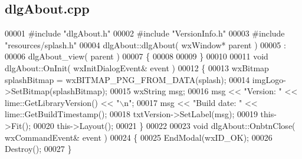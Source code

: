 \subsection{dlg\+About.\+cpp}
\label{dlgAbout_8cpp_source}

\begin{DoxyCode}
00001 \textcolor{preprocessor}{#include "dlgAbout.h"}
00002 \textcolor{preprocessor}{#include "VersionInfo.h"}
00003 \textcolor{preprocessor}{#include "resources/splash.h"}
00004 dlgAbout::dlgAbout( wxWindow* parent )
00005 :
00006 dlgAbout_view( parent )
00007 \{
00008 
00009 \}
00010 
00011 \textcolor{keywordtype}{void} dlgAbout::OnInit( wxInitDialogEvent& event )
00012 \{
00013     wxBitmap splashBitmap = wxBITMAP\_PNG\_FROM\_DATA(splash);
00014     imgLogo->SetBitmap(splashBitmap);
00015     wxString msg;
00016     msg << \textcolor{stringliteral}{"Version: "} << lime::GetLibraryVersion() << \textcolor{stringliteral}{"\(\backslash\)n"};
00017     msg << \textcolor{stringliteral}{"Build date: "} << lime::GetBuildTimestamp();
00018     txtVersion->SetLabel(msg);
00019     this->Fit();
00020     this->Layout();
00021 \}
00022 
00023 \textcolor{keywordtype}{void} dlgAbout::OnbtnClose( wxCommandEvent& event )
00024 \{
00025     EndModal(wxID\_OK);
00026     Destroy();
00027 \}
\end{DoxyCode}
